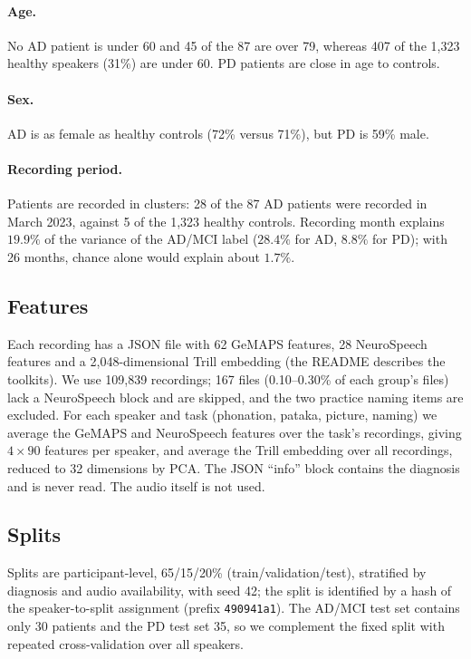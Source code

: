 \documentclass[10pt]{article}
\begin{document}
\paragraph{Age.} No AD patient is under 60 and 45 of the 87 are over 79, whereas 407 of the 1,323 healthy speakers (31\%) are under 60. PD patients are close in age to controls.
\paragraph{Sex.} AD is as female as healthy controls (72\% versus 71\%), but PD is 59\% male.
\paragraph{Recording period.} Patients are recorded in clusters: 28 of the 87 AD patients were recorded in March 2023, against 5 of the 1,323 healthy controls. Recording month explains $19.9\%$ of the variance of the AD/MCI label ($28.4\%$ for AD, $8.8\%$ for PD); with 26 months, chance alone would explain about $1.7\%$.

\subsection{Features}
Each recording has a JSON file with 62 GeMAPS features, 28 NeuroSpeech features and a 2,048-dimensional Trill embedding (the README describes the toolkits). We use 109{,}839 recordings; 167 files (0.10--0.30\% of each group's files) lack a NeuroSpeech block and are skipped, and the two practice naming items are excluded. For each speaker and task (phonation, pataka, picture, naming) we average the GeMAPS and NeuroSpeech features over the task's recordings, giving $4\times 90$ features per speaker, and average the Trill embedding over all recordings, reduced to 32 dimensions by PCA. The JSON ``info'' block contains the diagnosis and is never read. The audio itself is not used.

\subsection{Splits}
Splits are participant-level, 65/15/20\% (train/validation/test), stratified by diagnosis and audio availability, with seed 42; the split is identified by a hash of the speaker-to-split assignment (prefix \texttt{490941a1}). The AD/MCI test set contains only 30 patients and the PD test set 35, so we complement the fixed split with repeated cross-validation over all speakers.
\end{document}
